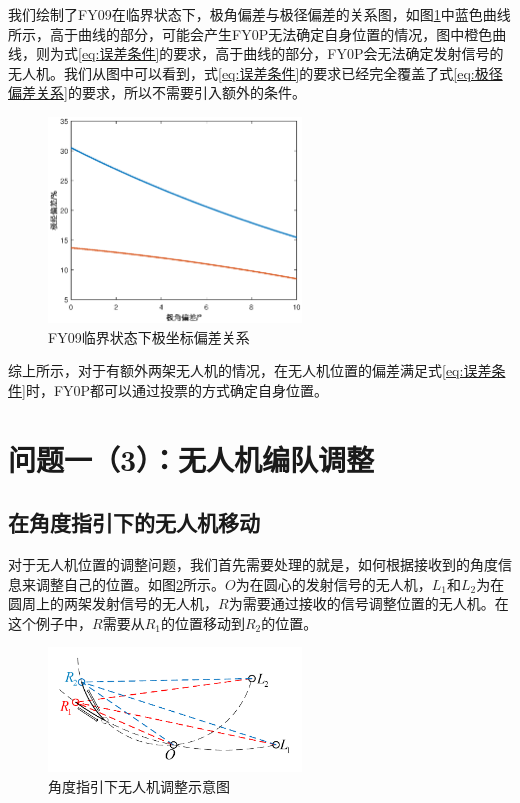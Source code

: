 \documentclass[12pt,AutoFakeSlant,AutoFakeBold]{article}
\begin{document}
我们绘制了FY09在临界状态下，极角偏差与极径偏差的关系图，如图\ref{fig:极坐标偏差关系}中蓝色曲线所示，高于曲线的部分，可能会产生FY0P无法确定自身位置的情况，图中橙色曲线，则为式\ref{eq:误差条件}的要求，高于曲线的部分，FY0P会无法确定发射信号的无人机。我们从图中可以看到，式\ref{eq:误差条件}的要求已经完全覆盖了式\ref{eq:极径偏差关系}的要求，所以不需要引入额外的条件。

\begin{figure}[!ht]
    \centering
    \includegraphics[width = 0.6\textwidth]{图片/极角极径偏差.eps}
    \caption{FY09临界状态下极坐标偏差关系}
    \label{fig:极坐标偏差关系}
\end{figure}

综上所示，对于有额外两架无人机的情况，在无人机位置的偏差满足式\ref{eq:误差条件}时，FY0P都可以通过投票的方式确定自身位置。


\section{问题一（3）：无人机编队调整}

\subsection{在角度指引下的无人机移动}

对于无人机位置的调整问题，我们首先需要处理的就是，如何根据接收到的角度信息来调整自己的位置。如图\ref{fig:角度指引下无人机调整}所示。$O$为在圆心的发射信号的无人机，$L_1$和$L_2$为在圆周上的两架发射信号的无人机，$R$为需要通过接收的信号调整位置的无人机。在这个例子中，$R$需要从$R_1$的位置移动到$R_2$的位置。
\begin{figure}[!ht]
    \centering
    \includegraphics[width=0.6\textwidth]{图片/问题1-3示意图1.pdf}
    \caption{角度指引下无人机调整示意图}
    \label{fig:角度指引下无人机调整}    
\end{figure}
\end{document}
